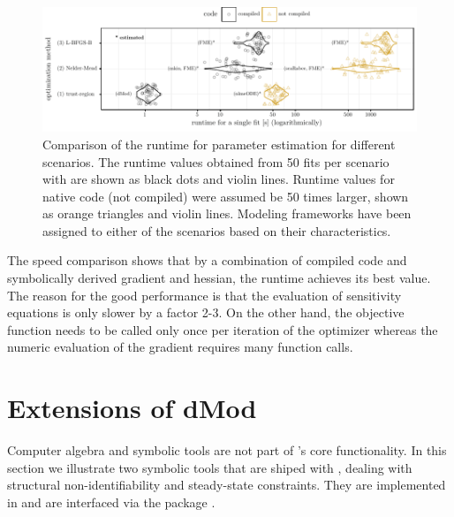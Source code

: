 \documentclass[article]{jss}
\begin{document}
\begin{figure}[ht]

	\centering
	\includegraphics[width=6in]{images/figure10}
	\caption{Comparison of the runtime for parameter estimation for different scenarios. The runtime values obtained from 50 fits per scenario with  are shown as black dots and violin lines. Runtime values for native  code (not compiled) were assumed be 50 times larger, shown as orange triangles and violin lines. Modeling frameworks have been assigned to either of the scenarios based on their characteristics.}
	\label{fig:comparison}
\end{figure}
The speed comparison shows that by a combination of compiled code and symbolically derived gradient and hessian, the runtime achieves its best value. The reason for the good performance is that the evaluation of sensitivity equations is only slower by a factor 2-3. On the other hand, the objective function needs to be called only once per iteration of the optimizer whereas the numeric evaluation of the gradient requires many function calls. 

\section{Extensions of dMod}
\label{sec:extensions}
Computer algebra and symbolic tools are not part of 's core functionality. In this section we illustrate two symbolic tools that are shiped with ,  dealing with structural non-identifiability and steady-state constraints. They are implemented in  and are interfaced via the  package \citep{rPython}.
\end{document}
